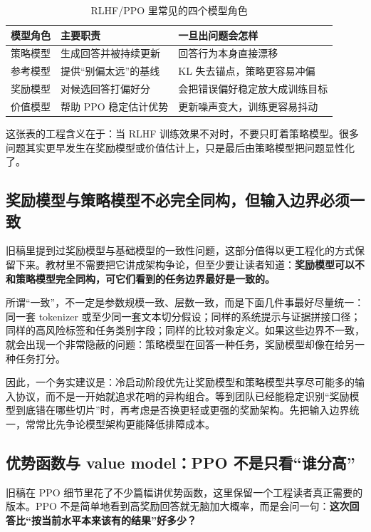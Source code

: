 \begin{table}[H]
\centering
\small
\begin{tabularx}{\textwidth}{>{\raggedright\arraybackslash}p{2.8cm}>{\raggedright\arraybackslash}p{3cm}>{\raggedright\arraybackslash}X}
\toprule
\textbf{模型角色} & \textbf{主要职责} & \textbf{一旦出问题会怎样} \\
\midrule
策略模型 & 生成回答并被持续更新 & 回答行为本身直接漂移 \\
参考模型 & 提供“别偏太远”的基线 & KL 失去锚点，策略更容易冲偏 \\
奖励模型 & 对候选回答打偏好分 & 会把错误偏好稳定放大成训练目标 \\
价值模型 & 帮助 PPO 稳定估计优势 & 更新噪声变大，训练更容易抖动 \\
\bottomrule
\end{tabularx}
\caption{RLHF/PPO 里常见的四个模型角色}
\label{tab:rlhf-four-models}
\end{table}

这张表的工程含义在于：当 RLHF 训练效果不对时，不要只盯着策略模型。很多问题其实更早发生在奖励模型或价值估计上，只是最后由策略模型把问题显性化了。

\subsection{奖励模型与策略模型不必完全同构，但输入边界必须一致}
旧稿里提到过奖励模型与基础模型的一致性问题，这部分值得以更工程化的方式保留下来。教材里不需要把它讲成架构争论，但至少要让读者知道：\textbf{奖励模型可以不和策略模型完全同构，可它们看到的任务边界最好是一致的。}

所谓“一致”，不一定是参数规模一致、层数一致，而是下面几件事最好尽量统一：同一套 tokenizer 或至少同一套文本切分假设；同样的系统提示与证据拼接口径；同样的高风险标签和任务类别字段；同样的比较对象定义。如果这些边界不一致，就会出现一个非常隐蔽的问题：策略模型在回答一种任务，奖励模型却像在给另一种任务打分。

因此，一个务实建议是：冷启动阶段优先让奖励模型和策略模型共享尽可能多的输入协议，而不是一开始就追求花哨的异构组合。等到团队已经能稳定识别“奖励模型到底错在哪些切片”时，再考虑是否换更轻或更强的奖励架构。先把输入边界统一，常常比先争论模型架构更能降低排障成本。

\subsection{优势函数与 value model：PPO 不是只看“谁分高”}
旧稿在 PPO 细节里花了不少篇幅讲优势函数，这里保留一个工程读者真正需要的版本。PPO 不是简单地看到高奖励回答就无脑加大概率，而是会问一句：\textbf{这次回答比“按当前水平本来该有的结果”好多少？}

